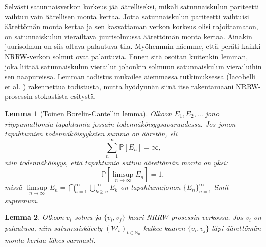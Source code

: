 \documentclass[finnish, 12pt, a4paper, sci, utf8, pdfa]{aaltothesis}
\newcommand{\N}{\mathbb{N}}
\newcommand{\Wrandom}{\mathcal{W}}
\newcommand*{\prob}{\mathbb{P}}
\newtheorem{lemma}{Lemma}
\begin{document}
Selvästi satunnaisverkon korkeus jää äärelliseksi, mikäli satunnaiskulun pariteetti vaihtuu vain äärellisen monta kertaa. Jotta satunnaiskulun pariteetti vaihtuisi äärettömän monta kertaa
ja sen kasvattaman verkon korkeus olisi rajoittamaton, on satunnaiskulun vierailtava juurisolmussa äärettömän monta kertaa. Ainakin juurisolmun on siis oltava palautuva tila. Myöhemmin
näemme, että peräti kaikki NRRW-verkon solmut ovat palautuvia. Ennen sitä osoitan kuitenkin lemman, joka liittää satunnaiskulun vierailut johonkin solmuun satunnaiskulun vierailuihin sen
naapureissa. Lemman todistus mukailee aiemmassa tutkimuksessa (Iacobelli et al. \cite{Iacobelli}) rakennettua todistusta, mutta hyödynnän siinä itse rakentamaani NRRW-prosessin stokastista
esitystä.

\begin{lemma}[Toinen Borelin-Cantellin lemma]
   Olkoon $ E_{1}, E_{2}, \ldots $ jono riippumattomia tapahtumia jossain todennäköisyysavaruudessa. Jos jonon tapahtumien todennäköisyyksien summa on ääretön, eli
   \[
      \sum_{n = 1}^{\infty} \prob \left[ E_{n} \right] = \infty,
   \]
   niin todennäköisyys, että tapahtumia sattuu äärettömän monta on yksi:
   \[
      \prob \left[ \limsup \limits_{n \rightarrow \infty} E_{n} \right] = 1,
   \]
   missä $ \limsup \limits_{n \rightarrow \infty} E_{n} = \bigcap_{n = 1}^{\infty} \bigcup_{k \geq n}^{\infty} E_{k} $ on tapahtumajonon $ \{ E_{n} \}_{n=1}^{\infty} $ limit supremum.
\label{lemma:borel-cantelli}
\end{lemma}

\begin{lemma}
Olkoon $ v_{i} $ solmu ja $ \{v_{i}, v_{j}\} $ kaari NRRW-prosessin verkossa. Jos $ v_{i} $ on palautuva, niin satunnaiskävely $ (\Wrandom_{t})_{t \in \N_{0}} $ kulkee kaaren $ \{v_{i}, v_{j}\} $ läpi äärettömän monta kertaa lähes varmasti.
\label{lemma:recurrence}
\end{lemma}
\end{document}
